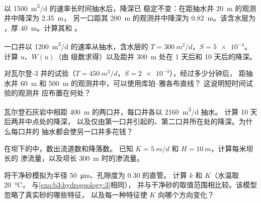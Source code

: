 \begin{exercise}[$\star\star$]\label{exo:b3:hydrogeology:5}
以 \qty{1500}{m^3/d} 的速率长时间抽水后，降深已
稳定不变：在距抽水井 \qty{20}{m} 的观测井中降深为 \qty{2.35}{m}，
另一口距其 \qty{200}{m} 的观测井中降深为 \qty{0.82}{m}。该含水层为
，厚 \qty{40}{m}。计算其和
。
\end{exercise}

\begin{exercise}[$\star\star$]\label{exo:b3:hydrogeology:6}
一口井以 \qty{1200}{m^3/d} 的速率从抽水，含水层的 $T =
\qty{300}{m^2/d}$，$S = \num{5e-4}$。计算 $u$、$W(u)$（由
级数求得）以及距井 \qty{300}{m} 处在 1 天后和 10 天后的降深。
\end{exercise}

\begin{exercise}[$\star\star$]\label{exo:b3:hydrogeology:7}
对瓦尔登-3 井的试验（$T = \qty{450}{m^2/d}$，$S = \num{2e-4}$），经过多少分钟后，
距抽水井 \qty{60}{m} 和 \qty{500}{m} 的观测井中，可以使用库珀–雅各布直线？
这说明短时间试验的观测井
应布置在何处？
\end{exercise}

\begin{exercise}[$\star\star$]\label{exo:b3:hydrogeology:8}
瓦尔登石灰岩中相距 \qty{400}{m} 的两口井，每口井各以 \qty{2160}{m^3/d} 抽水。
计算 10 天后两井中点处的降深，
以及仅由第一口井引起的、第二口井所在处的降深。为什么每口井的
抽水都会使另一口井多花钱？
\end{exercise}

\begin{exercise}[$\star\star$]\label{exo:b3:hydrogeology:9}
在坝下的中，数出流道数和降落数。
已知 $K = \qty{5}{m/d}$ 和 $H = \qty{10}{m}$，计算每米坝长的
渗流量，以及坝长 \qty{300}{m} 时的渗流量。
\end{exercise}

\begin{exercise}[$\star\star\star$]\label{exo:b3:hydrogeology:10}
将干净砂模拟为半径 \qty{50}{\micro\metre}、孔隙度为 0.30 的直管。
计算 $k$ 和 $K$（水温取 \qty{20}{\celsius}，
与\cref{exo:b3:hydrogeology:3}相同），
并与干净砂的取值范围相比较。该模型忽略了真实砂的哪些特征，
以及每一种特征使 $K$ 向哪个方向变化？
\end{exercise}

